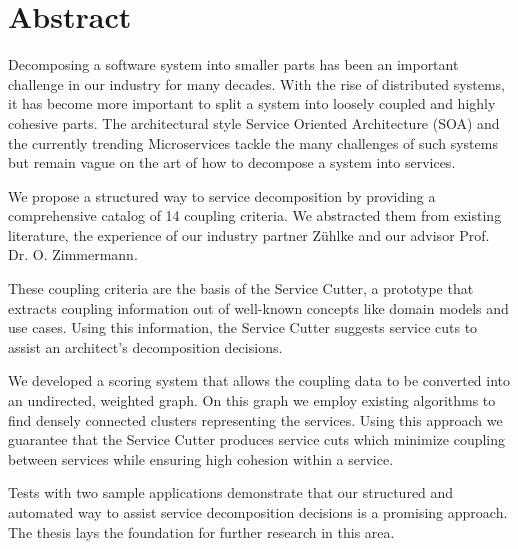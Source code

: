 \chapter{Abstract}

Decomposing a software system into smaller parts has been an important challenge in our industry for many decades. With the rise of distributed systems, it has become more important to split a system into loosely coupled and highly cohesive parts. The architectural style Service Oriented Architecture (SOA) and the currently trending Microservices tackle the many challenges of such systems but remain vague on the art of how to decompose a system into services.

We propose a structured way to service decomposition by providing a comprehensive catalog of 14 coupling criteria. We abstracted them from existing literature, the experience of our industry partner Zühlke and our advisor Prof. Dr. O. Zimmermann.

These coupling criteria are the basis of the Service Cutter, a prototype that extracts coupling information out of well-known concepts like domain models and use cases. Using this information, the Service Cutter suggests service cuts to assist an architect’s decomposition decisions. 

We developed a scoring system that allows the coupling data to be converted into an undirected, weighted graph. On this graph we employ existing algorithms to find densely connected clusters representing the services. Using this approach we guarantee that the Service Cutter produces service cuts which minimize coupling between services while ensuring high cohesion within a service. 

Tests with two sample applications demonstrate that our structured and automated way to assist service decomposition decisions is a promising approach. The thesis lays the foundation for further research in this area.